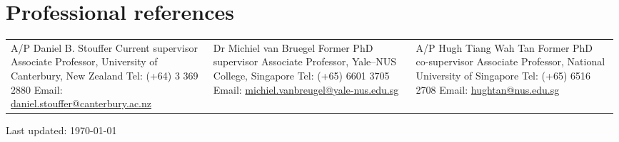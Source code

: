 \documentclass[a4paper]{article}
\def\footerlink{}
\begin{document}
\section*{Professional references}
\begin{tabular}{p{0.33\linewidth} p{0.33\linewidth} p{0.33\linewidth}}
A/P Daniel B. Stouffer \newline Current supervisor \newline Associate Professor, University of Canterbury, New Zealand \newline Tel: (+64) 3 369 2880 \newline Email: \url{daniel.stouffer@canterbury.ac.nz} &
Dr Michiel van Bruegel \newline Former PhD supervisor \newline Associate Professor, Yale--NUS College, Singapore \newline Tel: (+65) 6601 3705 \newline Email: \url{michiel.vanbreugel@yale-nus.edu.sg} &
A/P Hugh Tiang Wah Tan \newline Former PhD co-supervisor \newline Associate Professor, National University of Singapore \newline Tel: (+65) 6516 2708 \newline Email: \url{hughtan@nus.edu.sg} 
\end{tabular}

\vfill

\begin{center}
  \begin{footnotesize}
    Last updated: \today \\
    \href{\footerlink}{\texttt{\footerlink}}
  \end{footnotesize}
\end{center}
\end{document}
